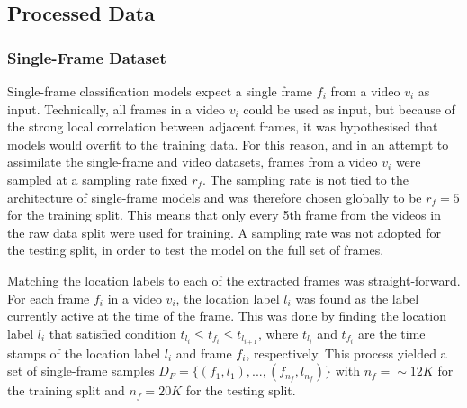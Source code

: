 \documentclass[a4paper]{article}
\begin{document}


\subsection{Processed Data} %
\label{sub:processed-data}

\subsubsection{Single-Frame Dataset} %

Single-frame classification models expect a single frame $f_i$ from a video
$v_i$ as input. Technically, all frames in a video $v_i$ could be used as input,
but because of the strong local correlation between adjacent frames, it was
hypothesised that models would overfit to the training data. For this reason,
and in an attempt to assimilate the single-frame and video datasets, frames from
a video $v_i$ were sampled at a sampling rate fixed $r_f$. The sampling rate is
not tied to the architecture of single-frame models and was therefore chosen
globally to be $r_f=5$ for the training split. This means that only every 5th
frame from the videos in the raw data split were used for training. A sampling
rate was not adopted for the testing split, in order to test the model on the
full set of frames.

Matching the location labels to each of the extracted frames was
straight-forward. For each frame $f_i$ in a video $v_i$, the location label
$l_i$ was found as the label currently active at the time of the frame. This was
done by finding the location label $l_i$ that satisfied condition $t_{l_i} \leq
t_{f_i} \leq t_{l_{i+1}}$, where $t_{l_i}$ and $t_{f_i}$ are the time stamps of
the location label $l_i$ and frame $f_i$, respectively. This process yielded a
set of single-frame samples $D_F = \{(f_1, l_1), ..., (f_{n_f}, l_{n_f})\}$ with
$n_f=\sim 12K$ for the training split and $n_f=20K$ for the testing split.
\end{document}
